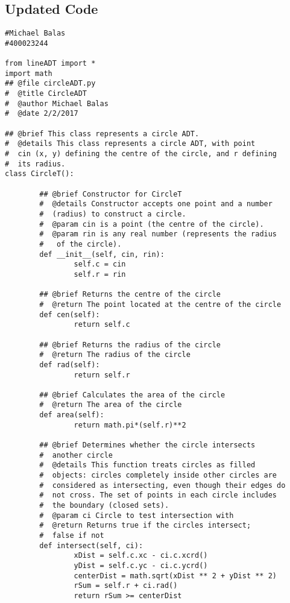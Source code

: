 \documentclass{article}
\begin{document}
\subsection{Updated Code}
\begin{lstlisting}
#Michael Balas
#400023244

from lineADT import *
import math
## @file circleADT.py
#  @title CircleADT
#  @author Michael Balas
#  @date 2/2/2017

## @brief This class represents a circle ADT. 
#  @details This class represents a circle ADT, with point
#  cin (x, y) defining the centre of the circle, and r defining 
#  its radius. 
class CircleT():

        ## @brief Constructor for CircleT
        #  @details Constructor accepts one point and a number 
        #  (radius) to construct a circle.
        #  @param cin is a point (the centre of the circle).
        #  @param rin is any real number (represents the radius 
        #   of the circle).
        def __init__(self, cin, rin):
                self.c = cin
                self.r = rin

        ## @brief Returns the centre of the circle
        #  @return The point located at the centre of the circle
        def cen(self):
                return self.c

        ## @brief Returns the radius of the circle
        #  @return The radius of the circle
        def rad(self):
                return self.r
        
        ## @brief Calculates the area of the circle
        #  @return The area of the circle
        def area(self):
                return math.pi*(self.r)**2
        
        ## @brief Determines whether the circle intersects 
        #  another circle
        #  @details This function treats circles as filled 
        #  objects: circles completely inside other circles are 
        #  considered as intersecting, even though their edges do 
        #  not cross. The set of points in each circle includes 
        #  the boundary (closed sets).
        #  @param ci Circle to test intersection with
        #  @return Returns true if the circles intersect; 
        #  false if not         
        def intersect(self, ci):
                xDist = self.c.xc - ci.c.xcrd()
                yDist = self.c.yc - ci.c.ycrd()
                centerDist = math.sqrt(xDist ** 2 + yDist ** 2)
                rSum = self.r + ci.rad()
                return rSum >= centerDist


\end{lstlisting}
\end{document}
